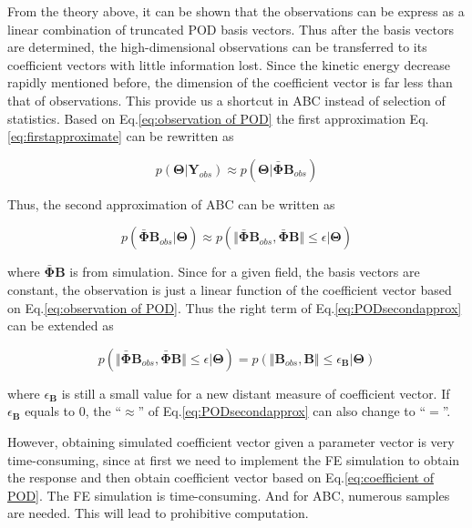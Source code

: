 \documentclass[review]{elsarticle}
\begin{document}
From the theory above, it can be shown that the observations can be express as a linear combination of truncated POD basis vectors. Thus after the basis vectors are determined, the high-dimensional observations can be transferred to its coefficient vectors with little information lost. Since the kinetic energy decrease rapidly mentioned before, the dimension of the coefficient vector is far less than that of observations. This provide us a shortcut in ABC instead of selection of statistics. Based on Eq.\ref{eq:observation of POD} the first approximation Eq.\ref{eq:firstapproximate} can be rewritten as 

\begin{equation}
\label{eq:PODfirstapprox}
p(\mathbf{\Theta}|\mathbf{Y}_{obs}) \approx p(\mathbf{\Theta}| \mathbf{\bar{\Phi}} \mathbf{B}_{obs})
\end{equation}

Thus, the second approximation of ABC can be written as 

\begin{equation}
\label{eq:PODsecondapprox}
p\left( \mathbf{\bar{\Phi}} \mathbf{B}_{obs} | \mathbf{\Theta} \right) \approx p\left( \Vert \mathbf{\bar{\Phi}} \mathbf{B}_{obs}, \mathbf{\bar{\Phi}} \mathbf{B} \Vert \leq \epsilon | \mathbf{\Theta} \right)
\end{equation}

\noindent where $\mathbf{\bar{\Phi}} \mathbf{B}$ is from simulation. Since for a given field, the basis vectors are constant, the observation is just a linear function of the coefficient vector based on Eq.\ref{eq:observation of POD}. Thus the right term of Eq.\ref{eq:PODsecondapprox} can be extended as 

\begin{equation}
\label{eq:abcpod}
p\left( \Vert \mathbf{\bar{\Phi}} \mathbf{B}_{obs}, \mathbf{\bar{\Phi}} \mathbf{B} \Vert \leq \epsilon | \mathbf{\Theta} \right) = p \left(\Vert \mathbf{B}_{obs}, \mathbf{B} \Vert \leq \epsilon _\mathbf{B} | \mathbf{\Theta} \right)
\end{equation}

\noindent where $\epsilon _\mathbf{B}$ is still a small value for a new distant measure of coefficient vector. If $\epsilon _\mathbf{B}$ equals to 0, the ``$\approx$'' of Eq.\ref{eq:PODsecondapprox} can also change to ``$=$''. 

However, obtaining simulated coefficient vector given a parameter vector is very time-consuming, since at first we need to implement the FE simulation to obtain the response and then obtain coefficient vector based on Eq.\ref{eq:coefficient of POD}. The FE simulation is time-consuming. And for ABC, numerous samples are needed. This will lead to prohibitive computation.
\end{document}
